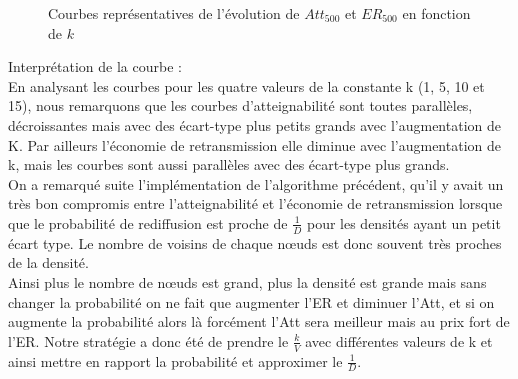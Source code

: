 \documentclass[10pt]{report}
\begin{document}
\begin{center}
\begin{figure}[H]
	\caption[courbe5]{Courbes représentatives de l'évolution de $Att_{500}$ et $ER_{500}$ en fonction de $k$}
\end{figure}
\end{center}

Interprétation de la courbe :\\

En analysant les courbes pour les quatre valeurs de la constante k (1, 5, 10 et 15), nous remarquons que les courbes d'atteignabilité sont toutes parallèles, décroissantes mais avec des écart-type plus petits grands avec l'augmentation de K. Par ailleurs l'économie de retransmission elle diminue avec l'augmentation de k, mais les courbes sont aussi parallèles avec des écart-type plus grands.\\  

On a remarqué suite l’implémentation de l’algorithme précédent, qu’il y avait un très bon compromis entre l’atteignabilité et l’économie de retransmission lorsque que le probabilité de rediffusion est proche de $\frac{1}{D}$ pour les densités ayant un petit écart type. Le nombre de voisins de chaque nœuds est donc souvent très proches de la densité.\\

Ainsi plus le nombre de nœuds est grand, plus la densité est grande mais sans changer la probabilité on ne fait que augmenter l’ER et diminuer l’Att, et si on augmente la probabilité alors là forcément l’Att sera meilleur mais au prix fort de l’ER.
Notre stratégie a donc été de prendre le $\frac{k}{V}$ avec différentes valeurs de k et ainsi mettre en rapport la probabilité et approximer le $\frac{1}{D}$.\\
\end{document}
